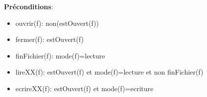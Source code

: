 \documentclass{article}
\begin{document}
    \textbf{Préconditions}: \begin{itemize}[label=$\- $, leftmargin=2cm, itemsep=0cm]
        \item ouvrir(f): non(estOuvert(f))
        \item fermer(f): estOuvert(f)
        \item finFichier(f): mode(f)=lecture
        \item lireXX(f): estOuvert(f) et mode(f)=lecture et non finFichier(f)
        \item ecrireXX(f): estOuvert(f) et mode(f)=ecriture
    \end{itemize}
\end{document}
